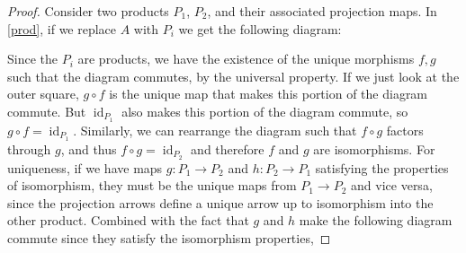 \begin{proof}
    Consider two products $P_1$, $P_2$, and their associated projection maps. In \cref{prod}, if we replace $A$ with $P_i $ we get the following diagram:
\begin{figure}[H]
\centering
{}
\end{figure} Since the $P_i $ are products, we have the existence of the unique morphisms $f,g$ such that the diagram commutes, by the universal property. If we just look at the outer square, $g\circ f$ is the unique map that makes this portion of the diagram commute. But $\operatorname{id}_{P_1}$ also makes this portion of the diagram commute, so $g\circ f=\operatorname{id}_{P_1}$. Similarly, we can rearrange the diagram such that $f\circ g$ factors through $g$, and thus $f\circ g=\operatorname{id}_{P_2}$ and therefore $f$ and $g$ are isomorphisms. For uniqueness, if we have maps $g \colon P_1 \to P_2$ and $h \colon P_2 \to P_1$ satisfying the properties of isomorphism, they must be the unique maps from $P_1\to P_2$ and vice versa, since the projection arrows define a unique arrow up to isomorphism into the other product. Combined with the fact that $g$ and $h$ make the following diagram commute since they satisfy the isomorphism properties,

\end{proof}
